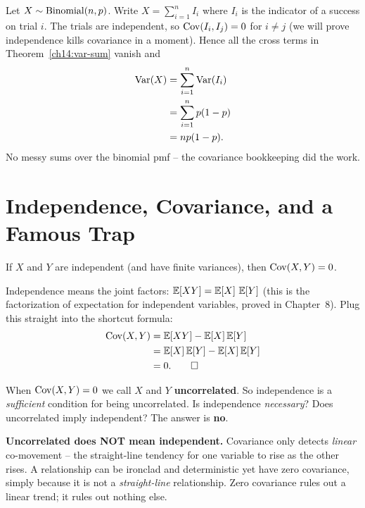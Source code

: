 \begin{example}
\label{ch14:ex-binom}
Let $X \sim \operatorname{Binomial}(n, p)$. Write $X = \sum_{i=1}^n I_i$ where $I_i$ is the indicator
of a success on trial $i$. The trials are independent, so $\operatorname{Cov}(I_i, I_j) = 0$ for
$i \ne j$ (we will prove independence kills covariance in a moment). Hence all the
cross terms in Theorem~\ref{ch14:var-sum} vanish and
\begin{align*}
\operatorname{Var}(X) &= \sum_{i=1}^n \operatorname{Var}(I_i) \\
&= \sum_{i=1}^n p(1-p) \\
&= np(1-p).
\end{align*}
No messy sums over the binomial pmf -- the covariance bookkeeping did the work.
\end{example}

\section{Independence, Covariance, and a Famous Trap}
\label{ch14:indep}

\begin{theorem}
\label{ch14:indep-implies-zero}
If $X$ and $Y$ are independent (and have finite variances), then
$\operatorname{Cov}(X, Y) = 0$.
\end{theorem}

\begin{whybox}
Independence means the joint factors: $\operatorname{\mathbb{E}}[XY] = \operatorname{\mathbb{E}}[X]\,\operatorname{\mathbb{E}}[Y]$ (this is the
factorization of expectation for independent variables, proved in
Chapter~8). Plug this straight into the shortcut formula:
\begin{align*}
\operatorname{Cov}(X, Y) &= \operatorname{\mathbb{E}}[XY] - \operatorname{\mathbb{E}}[X]\operatorname{\mathbb{E}}[Y] \\
&= \operatorname{\mathbb{E}}[X]\operatorname{\mathbb{E}}[Y] - \operatorname{\mathbb{E}}[X]\operatorname{\mathbb{E}}[Y] \\
&= 0. \qedhere
\end{align*}
\end{whybox}

When $\operatorname{Cov}(X, Y) = 0$ we call $X$ and $Y$ \textbf{uncorrelated}. So independence is
a \emph{sufficient} condition for being uncorrelated. Is independence \emph{necessary}? Does uncorrelated imply independent? The answer is \textbf{no}.

\begin{trapbox}
\textbf{Uncorrelated does NOT mean independent.} Covariance only detects
\emph{linear} co-movement -- the straight-line tendency for one variable to rise as
the other rises. A relationship can be ironclad and deterministic yet have zero
covariance, simply because it is not a \emph{straight-line} relationship. Zero
covariance rules out a linear trend; it rules out nothing else.
\end{trapbox}

